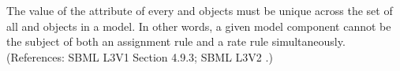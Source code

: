 The value of the attribute  of every \AssignmentRule and
\RateRule objects must be unique across the set of all \AssignmentRule and
\RateRule objects in a model.  In other words, a given model component
cannot be the subject of both an assignment rule and a rate rule
simultaneously.  (References: SBML L3V1 Section 4.9.3; SBML L3V2 .)
